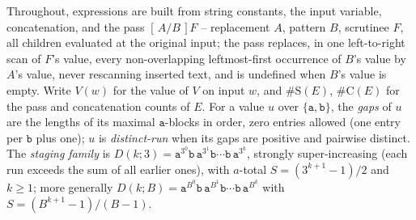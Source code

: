 
\noindent Throughout, expressions are built from string constants, the
input variable, concatenation, and the pass $[\,A/B\,]F$ -- replacement
$A$, pattern $B$, scrutinee $F$, all children evaluated at the original
input; the pass replaces, in one left-to-right scan of $F$'s value,
every non-overlapping leftmost-first occurrence of $B$'s value by
$A$'s value, never rescanning inserted text, and is undefined when
$B$'s value is empty.  Write $V(w)$ for the value of $V$ on input $w$,
and $\#\mathrm{S}(E)$, $\#\mathrm{C}(E)$ for the pass and
concatenation counts of $E$.  For a value $u$ over
$\{\mathtt a,\mathtt b\}$, the \emph{gaps} of $u$ are the lengths of
its maximal $\mathtt a$-blocks in order, zero entries allowed (one
entry per $\mathtt b$ plus one); $u$ is \emph{distinct-run} when its
gaps are positive and pairwise distinct.  The \emph{staging family} is
$D(k;3) = \mathtt a^{3^0}\mathtt b\,\mathtt a^{3^1}\mathtt b\cdots
\mathtt b\,\mathtt a^{3^k}$, strongly super-increasing (each run
exceeds the sum of all earlier ones), with $a$-total
$S = (3^{k+1}-1)/2$ and $k \ge 1$; more generally
$D(k;B) = \mathtt a^{B^0}\mathtt b\,\mathtt a^{B^1}\mathtt b\cdots
\mathtt b\,\mathtt a^{B^k}$ with $S = (B^{k+1}-1)/(B-1)$.

